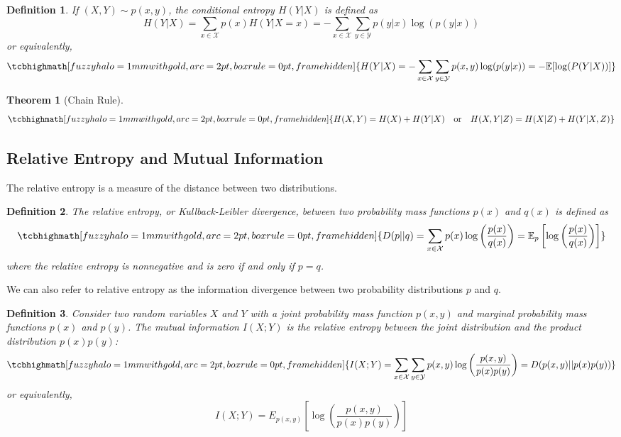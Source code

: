 \documentclass[a4paper,10pt]{article}
\newtheorem{theorem}{Theorem}
\newcommand{\equationgold}[1]{
  \tcbhighmath[fuzzy halo=1mm with gold,arc=2pt,boxrule=0pt,frame hidden]{#1}
}
\newtheorem{definition}{Definition}[section] %
\newcommand{\hlt}[1]{\colorbox{color3}{#1}}
\begin{document}
\begin{definition}
    If $(X, Y) \sim p(x, y)$, the \hlt{conditional entropy} $H(Y | X)$ is defined as
    \begin{equation}
        H(Y|X) = \sum_{x \in \mathcal{X}} p(x) H(Y | X = x) = - \sum_{x \in \mathcal{X}} \sum_{y \in \mathcal{Y}} p(y|x) \log(p(y|x))
    \end{equation}
    or equivalently,
    \begin{equation}
        \equationgold{
            H(Y|X) = - \sum_{x \in \mathcal{X}} \sum_{y \in \mathcal{Y}} p(x, y) \log(p(y|x)) = - \mathbb{E}[\log(P(Y|X))]
        }
    \end{equation}
\end{definition}

\begin{theorem}[Chain Rule]
    \begin{equation}
        \equationgold{
            H(X, Y) = H(X) + H(Y | X) \quad \text{or} \quad H(X, Y|Z) = H(X|Z) + H(Y|X, Z)
        }
    \end{equation}
\end{theorem}


\subsection{Relative Entropy and Mutual Information}

The \hlt{relative entropy} is a measure of the distance between two distributions.

\begin{definition}
    The relative entropy, or \hlt{Kullback-Leibler divergence}, between two probability mass functions $p(x)$ and $q(x)$ is defined as 
    \begin{equation}
        \equationgold{
            D(p || q) = \sum_{x \in \mathcal{X}} p(x) \log\left(\frac{p(x)}{q(x)}\right) = \mathbb{E}_p \left[\log\left(\frac{p(x)}{q(x)}\right)\right]
        }
    \end{equation}
    where the relative entropy is nonnegative and is zero if and only if $p = q$.
\end{definition}

We can also refer to relative entropy as the \hlt{information divergence} between two probability distributions $p$ and $q$.

\begin{definition}
    Consider two random variables $X$ and $Y$ with a joint probability mass function $p(x, y)$ and marginal probability mass functions $p(x)$ and $p(y)$. The \hlt{mutual information} $I(X; Y)$ is the relative entropy between the joint distribution and the product distribution $p(x)p(y)$:
    \begin{equation}
        \equationgold{
            I(X; Y) = \sum_{x \in \mathcal{X}} \sum_{y \in \mathcal{Y}} p(x, y) \log\left(\frac{p(x, y)}{p(x)p(y)}\right) = D(p(x, y) || p(x)p(y))
        }
    \end{equation}
    or equivalently,
    \begin{equation}
        I(X; Y) = E_{p(x, y)} \left[\log\left(\frac{p(x, y)}{p(x)p(y)}\right)\right]
    \end{equation}
\end{definition}
\end{document}
